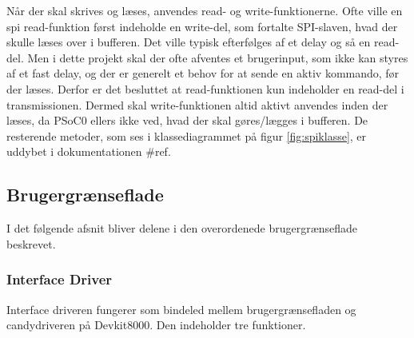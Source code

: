 Når der skal skrives og læses, anvendes read- og write-funktionerne. Ofte ville en spi read-funktion først indeholde en write-del, som fortalte SPI-slaven, hvad der skulle læses over i bufferen. Det ville typisk efterfølges af et delay og så en read-del. Men i dette projekt skal der ofte afventes et brugerinput, som ikke kan styres af et fast delay, og der er generelt et behov for at sende en aktiv kommando, før der læses. Derfor er det besluttet at read-funktionen kun indeholder en read-del i transmissionen. Dermed skal write-funktionen altid aktivt anvendes inden der læses, da PSoC0 ellers ikke ved, hvad der skal gøres/lægges i bufferen. De resterende metoder, som ses i klassediagrammet på figur \ref{fig:spiklasse}, er uddybet i dokumentationen \#ref.\\
   
\subsection{Brugergrænseflade}
I det følgende afsnit bliver delene i den overordenede brugergrænseflade beskrevet.

\subsubsection{Interface Driver}
Interface driveren fungerer som bindeled mellem brugergrænsefladen og candydriveren på Devkit8000. Den indeholder tre funktioner.

